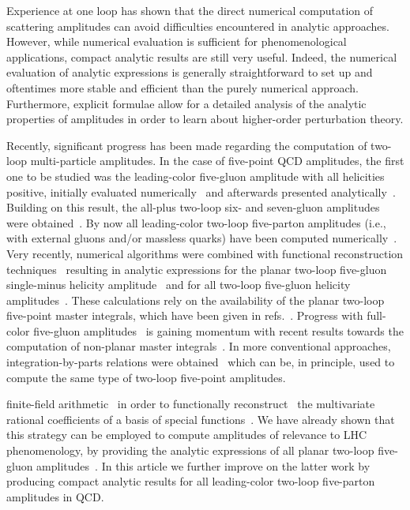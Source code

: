 Experience at one loop has shown that the direct numerical computation of
scattering amplitudes can avoid difficulties encountered in analytic
approaches. However, while numerical evaluation is sufficient for
phenomenological applications, compact analytic results are still very useful.  
Indeed, the numerical evaluation of analytic expressions is
generally straightforward to set up and oftentimes more stable and efficient
than the purely numerical approach.  Furthermore, explicit formulae allow for a
detailed analysis of the analytic properties of amplitudes in order to learn
about  higher-order perturbation theory.

Recently, significant
progress has been made regarding the computation of two-loop multi-particle
amplitudes.  In the case of five-point QCD amplitudes, the first one to be studied
was the leading-color five-gluon amplitude with all helicities positive, initially
evaluated numerically~\cite{Badger:2013gxa} and  
afterwards presented analytically~\cite{Gehrmann:2015bfy,Dunbar:2016aux}.
Building on this result, the all-plus two-loop six- and seven-gluon amplitudes were
obtained~\cite{Dunbar:2016gjb,Dunbar:2017nfy}.  By now all leading-color
two-loop five-parton amplitudes (i.e., with external gluons and/or
massless quarks) have been computed
numerically~\cite{Badger:2017jhb, Abreu:2017hqn, Badger:2018gip,
Abreu:2018jgq}. 
Very recently, numerical algorithms were combined with
functional reconstruction techniques~\cite{Peraro:2016wsq} resulting in
analytic expressions for the planar two-loop five-gluon single-minus helicity
amplitude~\cite{Badger:2018enw} and for all two-loop five-gluon helicity
amplitudes~\cite{Abreu:2018zmy}. These calculations rely on the availability
of the planar two-loop five-point master
integrals, which have been given in refs.~\cite{Papadopoulos:2015jft,Gehrmann:2018yef}. 
Progress with full-color five-gluon amplitudes~\cite{Badger:2015lda} is 
gaining momentum with recent results towards the computation of non-planar master
integrals~\cite{Abreu:2018aqd,Chicherin:2018old}.
In more conventional approaches, integration-by-parts relations were
obtained~\cite{Boels:2018nrr,Chawdhry:2018awn} which can be, in principle, used to compute the
same type of two-loop five-point amplitudes.

finite-field arithmetic~\cite{vonManteuffel:2014ixa,Peraro:2016wsq} in order to
functionally reconstruct~\cite{Peraro:2019svx,Peraro:2016wsq,Klappert:2019emp} the multivariate rational
coefficients of a basis of special functions~\cite{Gehrmann:2018yef}. We have
already shown that this strategy can be employed to compute amplitudes of
relevance to LHC phenomenology, by providing the analytic expressions of all
planar two-loop five-gluon amplitudes~\cite{Abreu:2018zmy}. In this article we
further improve on the latter work by producing compact analytic results for
all leading-color two-loop five-parton amplitudes in QCD.  

